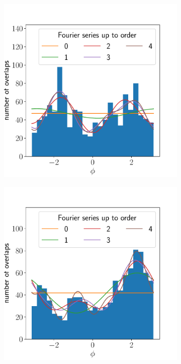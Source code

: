 \documentclass{article}
\begin{document}
\begin{figure}[ht]
	\centering
	\begin{subfigure}{0.24\linewidth}
		\includegraphics[width=\linewidth]{isotropy-histogram-JHUVectra-4-all}
		\caption{}
		\label{fig:isotropyhistvectra4all}
	\end{subfigure}
	\begin{subfigure}{0.24\linewidth}
		\includegraphics[width=\linewidth]{isotropy-histogram-JHUVectra-3-all}

\end{subfigure}
\end{figure}
\end{document}
